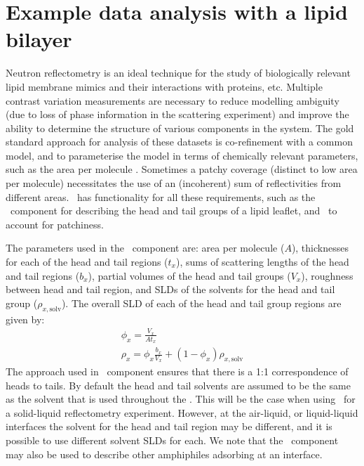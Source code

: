 \documentclass[pdf,preprint]{iucr}
\begin{document}
\section{Example data analysis with a lipid bilayer}

Neutron reflectometry is an ideal technique for the study of biologically relevant lipid membrane mimics and their interactions with proteins, etc. Multiple contrast variation measurements are necessary to reduce modelling ambiguity (due to loss of phase information in the scattering experiment) and improve the ability to determine the structure of various components in the system. The gold standard approach for analysis of these datasets is co-refinement with a common model, and to parameterise the model in terms of chemically relevant parameters, such as the area per molecule \cite{campbell2018}. Sometimes a patchy coverage (distinct to low area per molecule) necessitates the use of an (incoherent) sum of reflectivities from different areas. \ has functionality for all these requirements, such as the \LipidLeaflet\ component for describing the head and tail groups of a lipid leaflet, and \MixedReflectModel\ to account for patchiness.

The parameters used in the \LipidLeaflet\ component are: area per molecule ($A$), thicknesses for each of the head and tail regions ($t_x$), sums of scattering lengths of the head and tail regions ($b_x$), partial volumes of the head and tail groups ($V_x$), roughness between head and tail region, and SLDs of the solvents for the head and tail group ($\rho_{x,\mathrm{solv}}$). The overall SLD of each of the head and tail group regions are given by:
\begin{gather} 
\label{eqn:3} \phi_{x} = \frac{V_x}{At_x}\\
\rho_x =  \phi_{x} \frac{b_x}{V_x} + (1 - \phi_{x})\rho_{x,\mathrm{solv}} \label{eqn:4}
\end{gather}
The approach used in \LipidLeaflet\ component ensures that there is a 1:1 correspondence of heads to tails.
By default the head and tail solvents are assumed to be the same as the solvent that is used throughout the \Structure. This will be the case when using \LipidLeaflet\ for a solid-liquid reflectometry experiment. However, at the air-liquid, or liquid-liquid interfaces the solvent for the head and tail region may be different, and it is possible to use different solvent SLDs for each. We note that the \LipidLeaflet\ component may also be used to describe other amphiphiles adsorbing at an interface.
\end{document}
